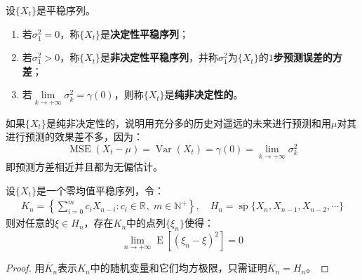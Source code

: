 \begin{definition}
	设$\{X_t\}$是平稳序列。
	\begin{enumerate}
		\item 若$\sigma_1^2=0$，称$\{X_t\}$是\textbf{决定性平稳序列}；
		\item 若$\sigma_1^2>0$，称$\{X_t\}$是\textbf{非决定性平稳序列}，并称$\sigma_1^2$为$\{X_t\}$的\textbf{$1$步预测误差的方差}；
		\item 若$\lim\limits_{k\to+\infty}\sigma_k^2=\gamma(0)$，则称$\{X_t\}$是\textbf{纯非决定性的}。
	\end{enumerate}
\end{definition}
\begin{note}
	如果$\{X_t\}$是纯非决定性的，说明用充分多的历史对遥远的未来进行预测和用$\mu$对其进行预测的效果差不多，因为：
	\begin{equation*}
		\operatorname{MSE}(X_t-\mu)=\operatorname{Var}(X_t)=\gamma(0)=\lim_{k\to+\infty}\sigma_k^2
	\end{equation*}
	即预测方差相近并且都为无偏估计。
\end{note}

\begin{lemma}
	设$\{X_t\}$是一个零均值平稳序列，令：
	\begin{gather*}
		K_n=\left\{\sum_{i=0}^{m}c_iX_{n-i}:c_i\in\mathbb{R}^{},\;m\in\mathbb{N}^+\right\},\quad
		H_n=\overline{\operatorname{sp}}\{X_n,X_{n-1},X_{n-2},\cdots\}
	\end{gather*}
	则对任意的$\xi\in H_n$，存在$K_n$中的点列$\{\xi_n\}$使得：
	\begin{equation*}
		\lim_{n\to+\infty}\operatorname{E}[(\xi_n-\xi)^2]=0
	\end{equation*}
\end{lemma}
\begin{proof}
	用$\overline{K}_n$表示$K_n$中的随机变量和它们均方极限，只需证明$\overline{K}_n=H_n$。
\end{proof}
